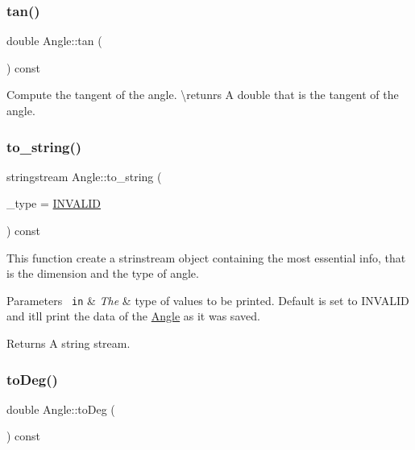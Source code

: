 \subsubsection{\texorpdfstring{tan()}{tan()}}
{\footnotesize\ttfamily double Angle\+::tan (\begin{DoxyParamCaption}{ }\end{DoxyParamCaption}) const\hspace{0.3cm}{\ttfamily [inline]}}



Compute the tangent of the angle. \textbackslash{}retunrs A {\ttfamily double} that is the tangent of the angle. 

\mbox{\label{class_angle_a5022b65b8a46e4050cde8a27cdc8d236}} 
\subsubsection{\texorpdfstring{to\_string()}{to\_string()}}
{\footnotesize\ttfamily stringstream Angle\+::to\+\_\+string (\begin{DoxyParamCaption}\item[{\mbox{\hyperlink{class_angle_a4f7b9849ce8780bcba95ca3ee45cff77}{A\+N\+G\+L\+E\+\_\+\+T\+Y\+PE}}}]{\+\_\+type = {\ttfamily \mbox{\hyperlink{class_angle_a4f7b9849ce8780bcba95ca3ee45cff77aa3c85e092f5da4bb998d0ddc6632dcbf}{I\+N\+V\+A\+L\+ID}}} }\end{DoxyParamCaption}) const\hspace{0.3cm}{\ttfamily [inline]}}

This function create a strinstream object containing the most essential info, that is the dimension and the type of angle. 
\begin{DoxyParams}[1]{Parameters}
\mbox{\texttt{ in}}  & {\em The} & type of values to be printed. Default is set to I\+N\+V\+A\+L\+ID and it\textquotesingle{}ll print the data of the {\ttfamily \mbox{\hyperlink{class_angle}{Angle}}} as it was saved. \\
\hline
\end{DoxyParams}
\begin{DoxyReturn}{Returns}
A string stream. 
\end{DoxyReturn}
\mbox{\label{class_angle_a89b1e5b7b71fc1bf9565da0bef8f361f}} 
\subsubsection{\texorpdfstring{toDeg()}{toDeg()}}
{\footnotesize\ttfamily double Angle\+::to\+Deg (\begin{DoxyParamCaption}{ }\end{DoxyParamCaption}) const\hspace{0.3cm}{\ttfamily [inline]}}



